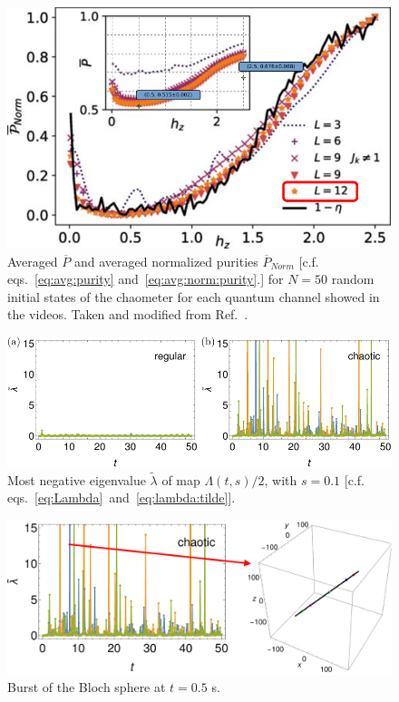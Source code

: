 \documentclass[10pt,letterpaper]{article}
\newcommand{\jami}{Jamiołkowski}
\begin{document}
\begin{figure}
\centering
\includegraphics[width=0.9\linewidth]{mirkin2021_fig2_modified.pdf}
\caption{Averaged $\overline P$ and averaged normalized purities 
$\overline P_{Norm}$ [c.f. eqs.~\eqref{eq:avg:purity} and~\eqref{eq:avg:norm:purity}.] for $N=50$ random initial states of 
the chaometer for each quantum channel showed in the videos.
Taken and modified from Ref.~\cite{mirkin2021quantum}.}
\label{fig:mirkin2021:fig2:modified}
\end{figure}

\begin{figure}
\centering
\includegraphics[width=\textwidth]{lambda_tilde_choi.pdf}
\caption{Most negative eigenvalue $\tilde \lambda$ of map $\Lambda(t,s)/2$, 
with $s=0.1$ [c.f. eqs.~\eqref{eq:Lambda}~and~\eqref{eq:lambda:tilde}].}
\label{fig:lambda:tilde:Choi-\jami{}}
\end{figure}

\begin{figure}
\centering
\includegraphics[width=\textwidth]{burst.pdf}
\caption{Burst of the Bloch sphere at $t=0.5$ s.}
\label{fig:burst}
\end{figure}



\end{document}
